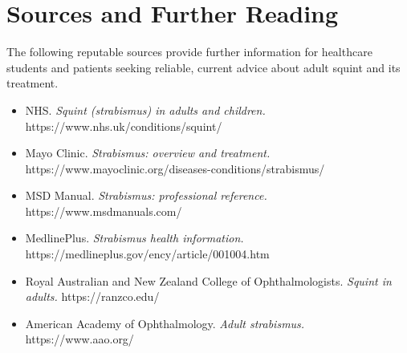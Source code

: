 \section*{Sources and Further Reading}
The following reputable sources provide further information for healthcare students and patients seeking reliable, current advice about adult squint and its treatment.

\begin{itemize}
    \item NHS. \textit{Squint (strabismus) in adults and children.} https://www.nhs.uk/conditions/squint/
    \item Mayo Clinic. \textit{Strabismus: overview and treatment.} https://www.mayoclinic.org/diseases-conditions/strabismus/
    \item MSD Manual. \textit{Strabismus: professional reference.} https://www.msdmanuals.com/
    \item MedlinePlus. \textit{Strabismus health information.} https://medlineplus.gov/ency/article/001004.htm
    \item Royal Australian and New Zealand College of Ophthalmologists. \textit{Squint in adults.} https://ranzco.edu/
    \item American Academy of Ophthalmology. \textit{Adult strabismus.} https://www.aao.org/
\end{itemize}
